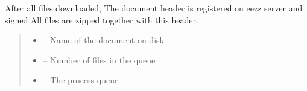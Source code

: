 \documentclass[letterpaper,10pt,english]{sphinxmanual}
\begin{document}
\begin{savenotes}
\begin{fulllineitems}
\begin{quote}
\begin{description}
\end{description}\end{quote}

\begin{savenotes}\begin{fulllineitems}
\label{\detokenize{eezz:eezz.document.TDocuments.add_document_to_device}}
\pysigstartsignatures
{}
\pysigstopsignatures
\end{fulllineitems}\end{savenotes}


\begin{savenotes}\begin{fulllineitems}
\label{\detokenize{eezz:eezz.document.TDocuments.create_document}}
\pysigstartsignatures
{}
\pysigstopsignatures
\sphinxAtStartPar
After all files downloaded, The document header is registered on eezz server and signed
All files are zipped together with this header.
\begin{quote}\begin{description}
\begin{itemize}
\item {} 
\sphinxAtStartPar
{} – Name of the document on disk

\item {} 
\sphinxAtStartPar
{} – Number of files in the queue

\item {} 
\sphinxAtStartPar
{} – The process queue


\end{itemize}
\end{description}
\end{quote}
\end{fulllineitems}
\end{savenotes}
\end{fulllineitems}
\end{savenotes}
\end{document}
